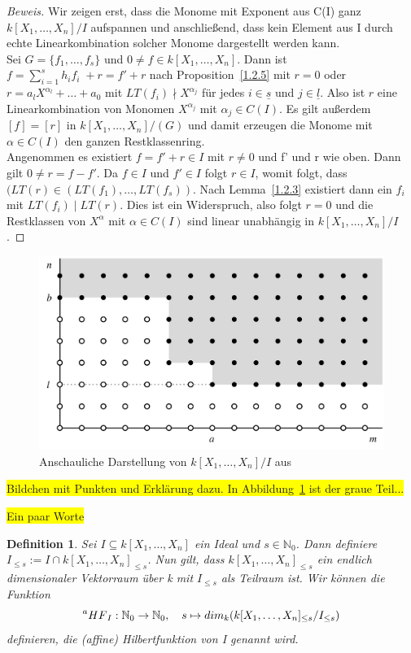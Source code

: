 \documentclass{article}
\newtheorem{definition}[satz]{Definition}
\newcommand*{\R}{k[X_{1},\ldots,X_{n}]}
\begin{document}
	\begin{proof}[Beweis]
	Wir zeigen erst, dass die Monome mit Exponent aus C(I) ganz \(k[X_{1},\ldots,X_{n}]/I\) 
	aufspannen und anschließend, dass kein Element aus I durch echte Linearkombination solcher
	Monome dargestellt werden kann. \\
	Sei \(G = \{f_{1}, \ldots, f_{s}\}\) und \(0 \neq f \in \R\). Dann ist
	\(f = \sum_{i=1}^{s} h_{i}f_{i}\; + r = f' + r\) nach Proposition~\ref{1.2.5} mit \(r=0\) oder 
	\(r = a_{l}X^{\alpha_{l}} + \ldots + a_{0}\) mit \(LT(f_{i}) \nmid X^{\alpha_{j}}\) 
	für jedes \(i \in \underline{s}\) und \(j \in \underline{l}\). Also ist \(r\) eine
	Linearkombination von Monomen \(X^{\alpha_{j}}\) mit \(\alpha_{j} \in C(I)\).
	Es gilt außerdem \([f] = [r]\) in \(\R/(G)\) und damit erzeugen die
	Monome mit \(\alpha \in C(I)\) den ganzen Restklassenring. \\
	Angenommen es existiert \(f = f' + r \in I\) mit \(r \neq 0\) und f' und r wie oben.
	Dann gilt \(0 \neq r = f - f'\). Da \(f \in I\) und \(f' \in I\) folgt
	\(r \in I\), womit folgt, dass \((LT(r) \in (LT(f_{1}), \ldots, LT(f_{s}))\).
	Nach Lemma~\ref{1.2.3} existiert dann ein \(f_{i}\) mit \(LT(f_{i})\; |\; LT(r)\). Dies ist 
	ein Widerspruch, also folgt \(r = 0\) und die Restklassen von \(X^{\alpha}\) mit
	\(\alpha \in C(I)\) sind linear unabhängig in \(\R/I\).
	\end{proof}
	

	\begin{figure}[ht]
		\centering
		\includegraphics[width=.75\linewidth]{Dots.png}
		\caption{Anschauliche Darstellung von \(\R/I\) aus \cite{CLOS}}
		\label{dots}
	\end{figure}
	
	\colorbox{yellow}{Bildchen mit Punkten und Erklärung dazu.
	In Abbildung~\ref{dots} ist der graue Teil...}

	
	\colorbox{yellow}{Ein paar Worte}


	\begin{definition} \label{1.2.11}
	Sei \(I \subseteq \R\) ein Ideal und \(s \in \mathbb{N}_{0}\). Dann definiere \(I_{\leq s} :=
	I \cap \R_{\leq s}\). Nun gilt, dass \(\R_{\leq s}\) ein endlich dimensionaler Vektorraum über
	k  mit \(I_{\leq s}\) als Teilraum ist. Wir können die Funktion \begin{displaymath}
	\prescript{a}{}{HF}_{I} : \mathbb{N}_{0} \rightarrow \mathbb{N}_{0}, \quad s \mapsto
	dim_{k}(\R_{\leq s}/I_{\leq s})	\end{displaymath} definieren, die (affine) Hilbertfunktion
	von I genannt wird.
	\end{definition}
\end{document}
